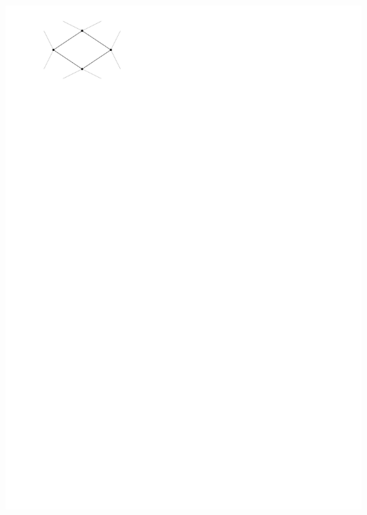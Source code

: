 \documentclass[a4paper]{article}
\begin{document}
\includegraphics[width = \textwidth]{./introduction/img/4cycle.pdf}
\clearpage%
\end{document}
